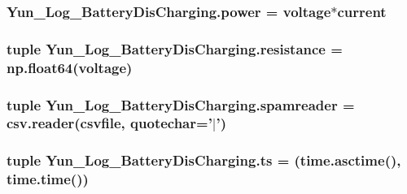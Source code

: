 \hypertarget{namespaceYun__Log__BatteryDisCharging_a7c9819144fe5b77a4121c5c2b6b72db9}{
\subsubsection[{power}]{\setlength{\rightskip}{0pt plus 5cm}Yun\-\_\-\-Log\-\_\-\-Battery\-Dis\-Charging.\-power = {\bf voltage}$\ast$current}}\label{namespaceYun__Log__BatteryDisCharging_a7c9819144fe5b77a4121c5c2b6b72db9}
\hypertarget{namespaceYun__Log__BatteryDisCharging_a19af7a3497f83959d28f31bb4432606b}{
\subsubsection[{resistance}]{\setlength{\rightskip}{0pt plus 5cm}tuple Yun\-\_\-\-Log\-\_\-\-Battery\-Dis\-Charging.\-resistance = np.\-float64({\bf voltage})}}\label{namespaceYun__Log__BatteryDisCharging_a19af7a3497f83959d28f31bb4432606b}
\hypertarget{namespaceYun__Log__BatteryDisCharging_a1fc7e423503335a66f4fd41bbde26dad}{
\subsubsection[{spamreader}]{\setlength{\rightskip}{0pt plus 5cm}tuple Yun\-\_\-\-Log\-\_\-\-Battery\-Dis\-Charging.\-spamreader = csv.\-reader(csvfile, quotechar='$\vert$')}}\label{namespaceYun__Log__BatteryDisCharging_a1fc7e423503335a66f4fd41bbde26dad}
\hypertarget{namespaceYun__Log__BatteryDisCharging_a7b85c87d0afd81ec33b920d0365b20a0}{
\subsubsection[{ts}]{\setlength{\rightskip}{0pt plus 5cm}tuple Yun\-\_\-\-Log\-\_\-\-Battery\-Dis\-Charging.\-ts = (time.\-asctime(), time.\-time())}}\label{namespaceYun__Log__BatteryDisCharging_a7b85c87d0afd81ec33b920d0365b20a0}
